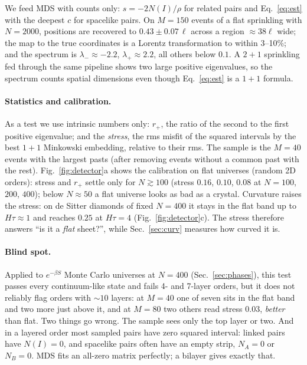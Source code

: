\documentclass[11pt,a4paper]{article}
\begin{document}
We feed MDS with counts only: $s=-2N(I)/\rho$ for related pairs and Eq.~\eqref{eq:est} with the deepest $c$ for spacelike pairs. On $M=150$ events of a flat sprinkling with $N=2000$, positions are recovered to $0.43\pm0.07\,\ell$ across a region $\approx38\ell$ wide; the map to the true coordinates is a Lorentz transformation to within 3--10\%; and the spectrum is $\lambda_-\approx-2.2$, $\lambda_+\approx2.2$, all others below $0.1$. A $2+1$ sprinkling fed through the same pipeline shows two large positive eigenvalues, so the spectrum counts spatial dimensions even though Eq.~\eqref{eq:est} is a $1+1$ formula.

\paragraph{Statistics and calibration.} As a test we use intrinsic numbers only: $r_+$, the ratio of the second to the first positive eigenvalue; and the \emph{stress}, the rms misfit of the squared intervals by the best $1+1$ Minkowski embedding, relative to their rms. The sample is the $M=40$ events with the largest pasts (after removing events without a common past with the rest). Fig.~\ref{fig:detector}a shows the calibration on flat universes (random 2D orders): stress and $r_+$ settle only for $N\gtrsim100$ (stress $0.16$, $0.10$, $0.08$ at $N=100$, $200$, $400$); below $N\approx50$ a flat universe looks as bad as a crystal. Curvature raises the stress: on de Sitter diamonds of fixed $N=400$ it stays in the flat band up to $H\tau\approx1$ and reaches $0.25$ at $H\tau=4$ (Fig.~\ref{fig:detector}c). The stress therefore answers ``is it a \emph{flat} sheet?'', while Sec.~\ref{sec:curv} measures how curved it is.

\paragraph{Blind spot.} Applied to $e^{-\beta S}$ Monte Carlo universes at $N=400$ (Sec.~\ref{sec:phases}), this test passes every continuum-like state and fails 4- and 7-layer orders, but it does not reliably flag orders with $\sim10$ layers: at $M=40$ one of seven sits in the flat band and two more just above it, and at $M=80$ two others read stress $0.03$, \emph{better} than flat. Two things go wrong. The sample sees only the top layer or two. And in a layered order most sampled pairs have zero squared interval: linked pairs have $N(I)=0$, and spacelike pairs often have an empty strip, $N_A=0$ or $N_B=0$. MDS fits an all-zero matrix perfectly; a bilayer gives exactly that.
\end{document}
